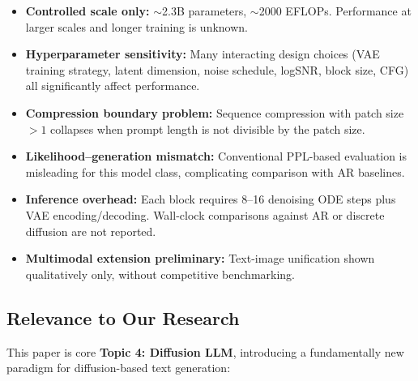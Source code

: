 \documentclass[11pt]{article}
\begin{document}
\begin{itemize}
    \item \textbf{Controlled scale only:} $\sim$2.3B parameters, $\sim$2000 EFLOPs. Performance at larger scales and longer training is unknown.
    \item \textbf{Hyperparameter sensitivity:} Many interacting design choices (VAE training strategy, latent dimension, noise schedule, logSNR, block size, CFG) all significantly affect performance.
    \item \textbf{Compression boundary problem:} Sequence compression with patch size $>1$ collapses when prompt length is not divisible by the patch size.
    \item \textbf{Likelihood--generation mismatch:} Conventional PPL-based evaluation is misleading for this model class, complicating comparison with AR baselines.
    \item \textbf{Inference overhead:} Each block requires 8--16 denoising ODE steps plus VAE encoding/decoding. Wall-clock comparisons against AR or discrete diffusion are not reported.
    \item \textbf{Multimodal extension preliminary:} Text-image unification shown qualitatively only, without competitive benchmarking.
\end{itemize}

\subsection{Relevance to Our Research}

This paper is core \textbf{Topic 4: Diffusion LLM}, introducing a fundamentally new paradigm for diffusion-based text generation:
\end{document}
